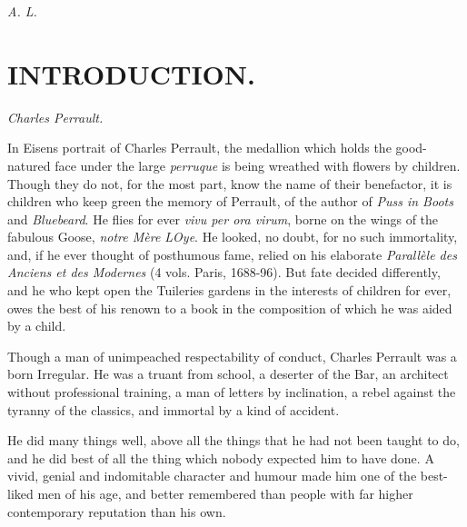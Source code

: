 \documentclass[14pt,a4paper]{memoir}
\newcommand{\notechapter}[1]{%
  \addtonotes{\protect\section*{#1}}%
}
\begin{document}
\begin{flushright}
\itshape A. L.
\end{flushright}

\chapter{INTRODUCTION.}
\notechapter{INTRODUCTION.}

\begin{flushright}
\large \itshape Charles Perrault.
\end{flushright}

In Eisen\textquotesingle s portrait of Charles Perrault, the medallion
which holds the good-natured face under the large \emph{perruque} is
being wreathed with flowers by children. Though they do not, for the
most part, know the name of their benefactor, it is children who keep
green the memory of Perrault, of the author of \emph{Puss in Boots} and
\emph{Bluebeard}. He flies for ever \emph{vivu\textquotesingle{} per ora
virum}, borne on the wings of the fabulous Goose, \emph{notre Mère
L\textquotesingle Oye}. He looked, no doubt, for no such immortality,
and, if he ever thought of posthumous fame, relied on his elaborate
\emph{Parallèle des Anciens et des Modernes} (4 vols. Paris, 1688-96).
But fate decided differently, and he who kept open the Tuileries gardens
in the interests of children for ever, owes the best of his renown to a
book in the composition of which he was aided by a child.

Though a man of unimpeached respectability of conduct, Charles Perrault
was a born Irregular. He was a truant from school, a deserter of the
Bar, an architect without professional training, a man of letters by
inclination, a rebel against the tyranny of the classics, and immortal
by a kind of accident.

He did many things well, above all the things that he had not been
taught to do, and he did best of all the thing which nobody expected him
to have done. A vivid, genial and indomitable character and humour made
him one of the best-liked men of his age, and better remembered than
people with far higher contemporary reputation than his own.
\end{document}
